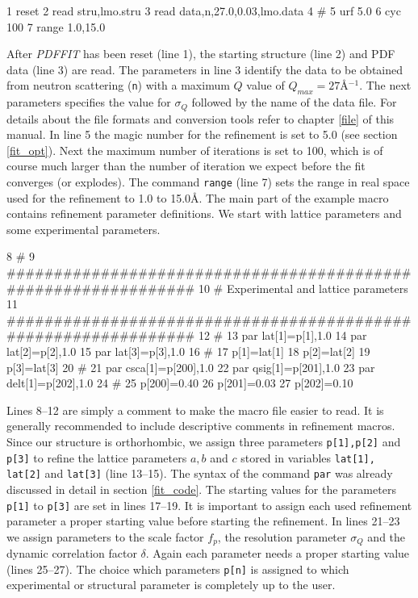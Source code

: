 \footnotesize
\begin{MacVerbatim}
      1 reset
      2 read stru,lmo.stru
      3 read data,n,27.0,0.03,lmo.data
      4 #
      5 urf 5.0
      6 cyc 100
      7 range 1.0,15.0
\end{MacVerbatim}
\normalsize

\noindent After {\it PDFFIT} has been reset (line 1), the starting
structure (line 2) and PDF data (line 3) are read. The parameters
in line 3 identify the data to be obtained from neutron scattering
({\tt n}) with a maximum $Q$ value of $Q_{max}=27$\AA$^{-1}$. The
next parameters specifies the value for $\sigma_{Q}$ followed by
the name of the data file. For details about the file formats and
conversion tools refer to chapter \ref{file} of this manual. In
line 5 the magic number for the refinement is set to 5.0 (see
section \ref{fit_opt}). Next the maximum number of iterations is
set to 100, which is of course much larger than the number of
iteration we expect before the fit converges (or explodes). The
command {\tt range} (line 7) sets the range in real space used for
the refinement to 1.0 to 15.0\AA. The main part of the example
macro contains refinement parameter definitions. We start with
lattice parameters and some experimental parameters.

\footnotesize
\begin{MacVerbatim}
      8 #
      9 ###############################################################
     10 # Experimental and lattice parameters
     11 ###############################################################
     12 #
     13 par lat[1]=p[1],1.0
     14 par lat[2]=p[2],1.0
     15 par lat[3]=p[3],1.0
     16 #
     17 p[1]=lat[1]
     18 p[2]=lat[2]
     19 p[3]=lat[3]
     20 #
     21 par csca[1]=p[200],1.0
     22 par qsig[1]=p[201],1.0
     23 par delt[1]=p[202],1.0
     24 #
     25 p[200]=0.40
     26 p[201]=0.03
     27 p[202]=0.10
\end{MacVerbatim}
\normalsize

\noindent Lines 8--12 are simply a comment to make the macro file
easier to read. It is generally recommended to include descriptive
comments in refinement macros. Since our structure is
orthorhombic, we assign three parameters {\tt p[1],p[2]} and {\tt
p[3]} to refine the lattice parameters $a,b$ and $c$ stored in
variables {\tt lat[1], lat[2]} and {\tt lat[3]} (line 13--15). The
syntax of the command {\tt par} was already discussed in detail in
section \ref{fit_code}. The starting values for the parameters
{\tt p[1]} to {\tt p[3]} are set in lines 17--19. It is important
to assign each used refinement parameter a proper starting value
before starting the refinement. In lines 21--23 we assign
parameters to the scale factor $f_{p}$, the resolution parameter
$\sigma_{Q}$ and the dynamic correlation factor $\delta$. Again
each parameter needs a proper starting value (lines 25--27). The
choice which parameters {\tt p[n]} is assigned to which
experimental or structural parameter is completely up to the user.

